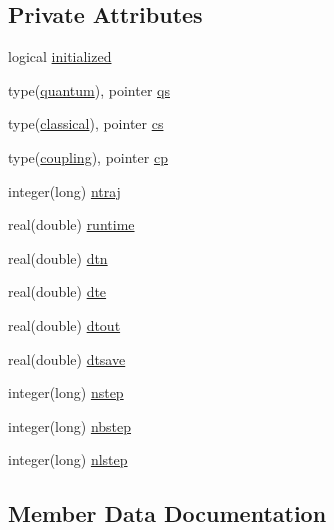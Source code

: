 \subsection*{Private Attributes}
\begin{DoxyCompactItemize}
\item 
logical \hyperlink{structpldm__class_1_1pldm_a1f68ee324c28b824df1acf99db3d7a6f}{initialized}
\item 
type(\hyperlink{structquantum__class_1_1quantum}{quantum}), pointer \hyperlink{structpldm__class_1_1pldm_a928fc31d7c422b903cf8be2c66ecc8ab}{qs}
\item 
type(\hyperlink{structclassical__class_1_1classical}{classical}), pointer \hyperlink{structpldm__class_1_1pldm_a2366c673bb4049d423c1605f801c49ab}{cs}
\item 
type(\hyperlink{structcoupling__class_1_1coupling}{coupling}), pointer \hyperlink{structpldm__class_1_1pldm_a029ca44825538a8806a9383f1b04914e}{cp}
\item 
integer(long) \hyperlink{structpldm__class_1_1pldm_aab5aaef447d621035a2492d5c64aa965}{ntraj}
\item 
real(double) \hyperlink{structpldm__class_1_1pldm_a6792078530b667f6e179e339ad3f705b}{runtime}
\item 
real(double) \hyperlink{structpldm__class_1_1pldm_a03a577c0a1845e2f6b01ab5aacb9bd0f}{dtn}
\item 
real(double) \hyperlink{structpldm__class_1_1pldm_a59460330dd0feba03a287ac14711d9a8}{dte}
\item 
real(double) \hyperlink{structpldm__class_1_1pldm_a0eb418c77739ccce504fb1b253fb81ba}{dtout}
\item 
real(double) \hyperlink{structpldm__class_1_1pldm_a94c39a7e7249bd187ee05bf43e4f6949}{dtsave}
\item 
integer(long) \hyperlink{structpldm__class_1_1pldm_a4cf2258a15663bb09c8deaacc46f8feb}{nstep}
\item 
integer(long) \hyperlink{structpldm__class_1_1pldm_a7559842c3c853eff4da5c5c59b5ca456}{nbstep}
\item 
integer(long) \hyperlink{structpldm__class_1_1pldm_a0c305b91e7503b54c413d3e84e83814f}{nlstep}
\end{DoxyCompactItemize}


\subsection{Member Data Documentation}
\mbox{\label{structpldm__class_1_1pldm_a029ca44825538a8806a9383f1b04914e}} 
